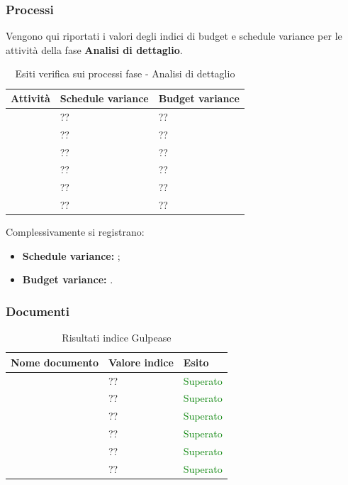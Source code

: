 		\subsubsection{Processi}
		Vengono qui riportati i valori degli indici di budget e schedule variance per le attività della fase \textbf{Analisi di dettaglio}.
			\begin{table}[!ht]
			\begin{center}
				\begin{tabularx}{0.9\textwidth}{|l|l|X|}
					\hline
					\textbf{Attività} & \textbf{Schedule variance} & \textbf{Budget variance}\\
					\hline						
					\docNameVersionAdR & ?? & ??\\
					\hline
					\docNameVersionGlo & ?? & ??\\
					\hline					
					\docNameVersionNdP & ?? & ??\\
					\hline					
					\docNameVersionPdP & ?? & ??\\
					\hline					
					\docNameVersionPdQ & ?? & ??\\
					\hline					
					\docNameVersionSdF & ?? & ??\\
					\hline				
				\end{tabularx}
			\end{center}
		\caption{Esiti verifica sui processi fase - Analisi di dettaglio}
	\end{table}
	Complessivamente si registrano:
	\begin{itemize}
	\item \textbf{Schedule variance:} ;
	\item \textbf{Budget variance:} .
	\end{itemize}
	 	\subsubsection{Documenti}
		\begin{table}[!ht]
			\begin{center}
				\begin{tabularx}{0.9\textwidth}{|l|l|X|}
					\hline
					\textbf{Nome documento} & \textbf{Valore indice} & \textbf{Esito}\\
					\hline						
					\docNameVersionAdR & ?? & \textcolor{green}{Superato}\\
					\hline
					\docNameVersionGlo & ?? & \textcolor{green}{Superato}\\
					\hline					
					\docNameVersionNdP & ?? & \textcolor{green}{Superato}\\
					\hline					
					\docNameVersionPdP & ?? & \textcolor{green}{Superato}\\
					\hline					
					\docNameVersionPdQ & ?? & \textcolor{green}{Superato}\\
					\hline					
					\docNameVersionSdF & ?? & \textcolor{green}{Superato}\\
					\hline				
				\end{tabularx}
			\end{center}
			\caption{Risultati indice Gulpease}
		\end{table}
